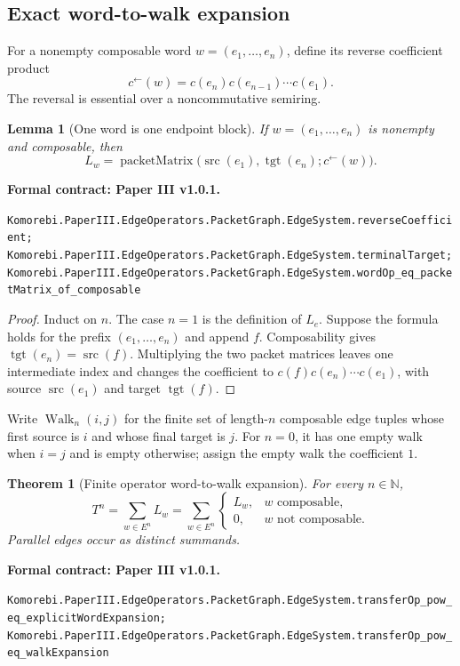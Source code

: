 \documentclass[11pt,a4paper]{article}
\newtheorem{theorem}{Theorem}[section]
\theoremstyle{plain}
\newtheorem{lemma}[lemma]{Lemma}
\theoremstyle{definition}
\theoremstyle{remark}
\newcommand{\N}{\mathbb N}
\newcommand{\src}{\operatorname{src}}
\newcommand{\tgt}{\operatorname{tgt}}
\newcommand{\Walk}{\operatorname{Walk}}
\newcommand{\leanname}[1]{\nolinkurl{#1}}
\newcommand{\statusleanthree}[1]{\par\smallskip\noindent\begin{minipage}{\linewidth}{\color{leanblue}\textbf{Formal contract: Paper III v1.0.1.}}\par\begingroup\small\raggedright\leanname{#1}\par\endgroup\end{minipage}\par\smallskip}
\begin{document}
\subsection{Exact word-to-walk expansion}

For a nonempty composable word $w=(e_1,\ldots,e_n)$, define its reverse
coefficient product
\[
  c^\leftarrow(w)=c(e_n)c(e_{n-1})\cdots c(e_1).
\]
The reversal is essential over a noncommutative semiring.

\begin{lemma}[One word is one endpoint block]
\label{lem:word-endpoint}
If $w=(e_1,\ldots,e_n)$ is nonempty and composable, then
\[
  L_w
  =
  \operatorname{packetMatrix}
  \bigl(\src(e_1),\tgt(e_n);c^\leftarrow(w)\bigr).
\]
\end{lemma}
\statusleanthree{Komorebi.PaperIII.EdgeOperators.PacketGraph.EdgeSystem.reverseCoefficient; Komorebi.PaperIII.EdgeOperators.PacketGraph.EdgeSystem.terminalTarget; Komorebi.PaperIII.EdgeOperators.PacketGraph.EdgeSystem.wordOp_eq_packetMatrix_of_composable}

\begin{proof}
Induct on $n$.  The case $n=1$ is the definition of $L_e$.  Suppose the
formula holds for the prefix $(e_1,\ldots,e_n)$ and append $f$.  Composability
gives $\tgt(e_n)=\src(f)$.  Multiplying the two packet matrices leaves one
intermediate index and changes the coefficient to
$c(f)c(e_n)\cdots c(e_1)$, with source $\src(e_1)$ and target $\tgt(f)$.
\end{proof}

Write $\Walk_n(i,j)$ for the finite set of length-$n$ composable edge tuples
whose first source is $i$ and whose final target is $j$.  For $n=0$, it has
one empty walk when $i=j$ and is empty otherwise; assign the empty walk the
coefficient $1$.

\begin{theorem}[Finite operator word-to-walk expansion]
\label{thm:word-to-walk}
For every $n\in\N$,
\[
  \boxed{
  T^n
  =
  \sum_{w\in E^n}L_w
  =
  \sum_{w\in E^n}
  \begin{cases}
  L_w,&w\text{ composable},\\
  0,&w\text{ not composable}.
  \end{cases}
  }
\]
Parallel edges occur as distinct summands.
\end{theorem}
\statusleanthree{Komorebi.PaperIII.EdgeOperators.PacketGraph.EdgeSystem.transferOp_pow_eq_explicitWordExpansion; Komorebi.PaperIII.EdgeOperators.PacketGraph.EdgeSystem.transferOp_pow_eq_walkExpansion}
\end{document}
